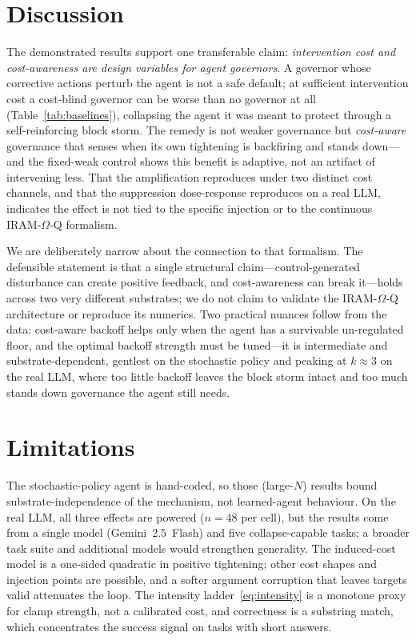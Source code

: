 \documentclass[11pt]{article}
\begin{document}
\section{Discussion}

The demonstrated results support one transferable claim: \emph{intervention cost
and cost-awareness are design variables for agent governors}. A governor whose
corrective actions perturb the agent is not a safe default; at sufficient
intervention cost a cost-blind governor can be worse than no governor at all
(Table~\ref{tab:baselines}), collapsing the agent it was meant to protect
through a self-reinforcing block storm. The remedy is not weaker governance but
\emph{cost-aware} governance that senses when its own tightening is backfiring
and stands down---and the fixed-weak control shows this benefit is adaptive, not
an artifact of intervening less. That the amplification reproduces under two
distinct cost channels, and that the suppression dose-response reproduces on a
real LLM, indicates the effect is not tied to the specific injection or to the
continuous IRAM-$\Omega$-Q formalism.

We are deliberately narrow about the connection to that formalism. The
defensible statement is that a single structural claim---control-generated
disturbance can create positive feedback, and cost-awareness can break
it---holds across two very different substrates; we do not claim to validate the
IRAM-$\Omega$-Q architecture or reproduce its numerics. Two practical nuances follow from
the data: cost-aware backoff helps only when the agent has a survivable
un-regulated floor, and the optimal backoff strength must be tuned---it is
intermediate and substrate-dependent, gentlest on the stochastic policy and
peaking at $k{\approx}3$ on the real LLM, where too little backoff leaves the
block storm intact and too much stands down governance the agent still needs.

\section{Limitations}

The stochastic-policy agent is hand-coded, so those (large-$N$) results bound
substrate-independence of the mechanism, not learned-agent behaviour. On the
real LLM, all three effects are powered ($n=48$ per cell), but the results come
from a single model (Gemini~2.5~Flash) and five collapse-capable tasks; a
broader task suite and additional models would strengthen generality. The
induced-cost model is a one-sided quadratic in positive
tightening; other cost shapes and injection points are possible, and a softer
argument corruption that leaves targets valid attenuates the loop. The intensity
ladder~\eqref{eq:intensity} is a monotone proxy for clamp strength, not a
calibrated cost, and correctness is a substring match, which concentrates the
success signal on tasks with short answers.
\end{document}
